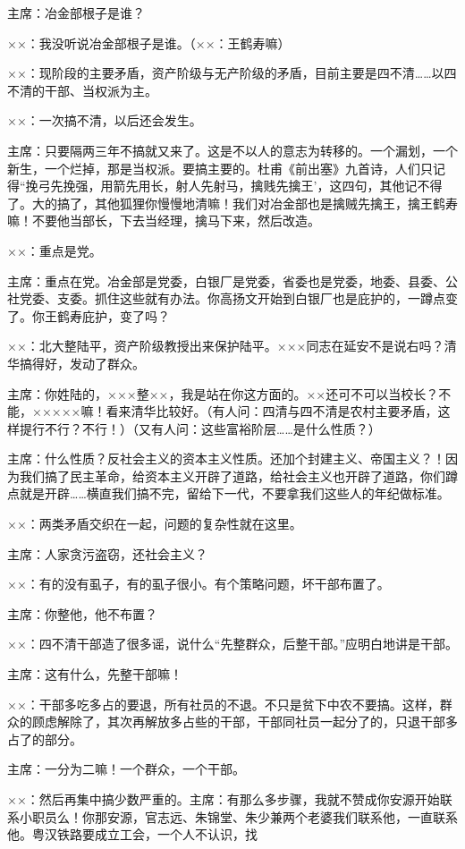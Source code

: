 主席：冶金部根子是谁？

××：我没听说冶金部根子是谁。（××：王鹤寿嘛）

××：现阶段的主要矛盾，资产阶级与无产阶级的矛盾，目前主要是四不清……以四不清的干部、当权派为主。

××：一次搞不清，以后还会发生。

主席：只要隔两三年不搞就又来了。这是不以人的意志为转移的。一个漏划，一个新生，一个烂掉，那是当权派。要搞主要的。杜甫《前出塞》九首诗，人们只记得“挽弓先挽强，用箭先用长，射人先射马，擒贱先擒王’，这四句，其他记不得了。大的搞了，其他狐狸你慢慢地清嘛！我们对冶金部也是擒贼先擒王，擒王鹤寿嘛！不要他当部长，下去当经理，擒马下来，然后改造。

××：重点是党。

主席：重点在党。冶金部是党委，白银厂是党委，省委也是党委，地委、县委、公社党委、支委。抓住这些就有办法。你高扬文开始到白银厂也是庇护的，一蹲点变了。你王鹤寿庇护，变了吗？

××：北大整陆平，资产阶级教授出来保护陆平。×××同志在延安不是说右吗？清华搞得好，发动了群众。

主席：你姓陆的，×××整××，我是站在你这方面的。××还可不可以当校长？不能，×××××嘛！看来清华比较好。（有人问：四清与四不清是农村主要矛盾，这样提行不行？不行！）（又有人问：这些富裕阶层……是什么性质？）

主席：什么性质？反社会主义的资本主义性质。还加个封建主义、帝国主义？！因为我们搞了民主革命，给资本主义开辟了道路，给社会主义也开辟了道路，你们蹲点就是开辟……横直我们搞不完，留给下一代，不要拿我们这些人的年纪做标准。

××：两类矛盾交织在一起，问题的复杂性就在这里。

主席：人家贪污盗窃，还社会主义？

××：有的没有虱子，有的虱子很小。有个策略问题，坏干部布置了。

主席：你整他，他不布置？

××：四不清干部造了很多谣，说什么“先整群众，后整干部。”应明白地讲是干部。

主席：这有什么，先整干部嘛！

××：干部多吃多占的要退，所有社员的不退。不只是贫下中农不要搞。这样，群众的顾虑解除了，其次再解放多占些的干部，干部同社员一起分了的，只退干部多占了的部分。

主席：一分为二嘛！一个群众，一个干部。

××：然后再集中搞少数严重的。主席：有那么多步骤，我就不赞成你安源开始联系小职员么！你那安源，官志远、朱锦堂、朱少兼两个老婆我们联系他，一直联系他。粤汉铁路要成立工会，一个人不认识，找


